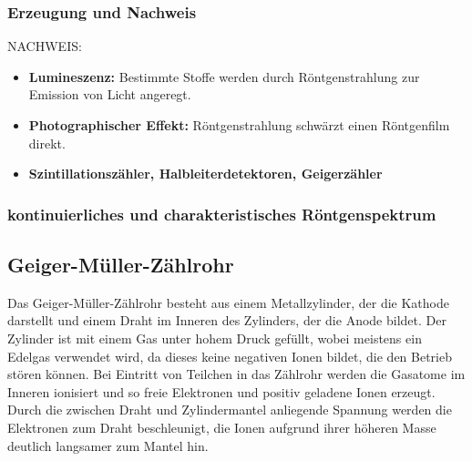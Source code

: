 \documentclass[11pt, a4paper]{article}
\numberwithin{equation}{section}
\begin{document}
\subsubsection{Erzeugung und Nachweis}
NACHWEIS:
\begin{itemize}
	\item \textbf{Lumineszenz:} Bestimmte Stoffe werden durch Röntgenstrahlung zur Emission von Licht angeregt.
	
	\item \textbf{Photographischer Effekt:} Röntgenstrahlung schwärzt einen Röntgenfilm direkt.
	
	\item \textbf{Szintillationszähler, Halbleiterdetektoren, Geigerzähler}
\end{itemize}

\subsubsection{kontinuierliches und charakteristisches Röntgenspektrum}


\subsection{Geiger-Müller-Zählrohr}
Das Geiger-Müller-Zählrohr besteht aus einem Metallzylinder, der die Kathode darstellt und einem Draht im Inneren des Zylinders, der die Anode bildet.
Der Zylinder ist mit einem Gas unter hohem Druck gefüllt, wobei meistens ein Edelgas verwendet wird, da dieses keine negativen Ionen bildet, die den Betrieb stören können.
Bei Eintritt von Teilchen in das Zählrohr werden die Gasatome im Inneren ionisiert und so freie Elektronen und positiv geladene Ionen erzeugt.
Durch die zwischen Draht und Zylindermantel anliegende Spannung werden die Elektronen zum Draht beschleunigt, die Ionen aufgrund ihrer höheren Masse deutlich langsamer zum Mantel hin.
\end{document}
